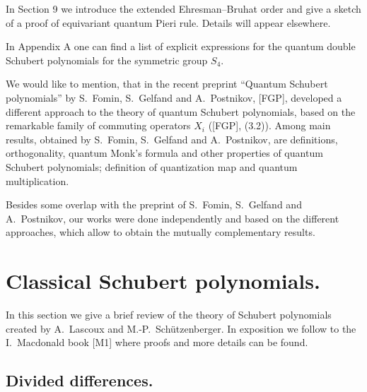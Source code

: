 {In Section 9 we introduce the extended Ehresman--Bruhat order and 
give a sketch of a proof of equivariant quantum Pieri rule. Details 
will appear elsewhere. 

In Appendix A one can find a list of explicit expressions for the quantum
double Schubert polynomials for the symmetric group $S_4$.

We would like to mention, that in the recent preprint 
``Quantum Schubert polynomials'' by
S.~Fomin, S.~Gelfand and A.~Postnikov, [FGP], developed a different
approach to the theory of quantum Schubert polynomials, based on 
the remarkable family of commuting operators $X_i$ ([FGP], (3.2)). 
Among main results, obtained by S.~Fomin, S.~Gelfand and A.~Postnikov, are
definitions, orthogonality, quantum Monk's formula and other 
properties of quantum Schubert polynomials; definition of quantization map 
and quantum multiplication. 

Besides some overlap with the preprint of S.~Fomin, S.~Gelfand
and A.~Postnikov, our works were done independently and based on 
the different approaches, which allow to obtain the mutually complementary
results. 

\section{Classical Schubert polynomials.}

In this section we give a brief review of the theory of Schubert 
polynomials created by A.~Lascoux and M.-P.~Sch\"utzenberger. In 	
exposition we follow to the I.~Macdonald book [M1] where proofs and more 
details can be found.


\subsection{Divided differences.}

}
